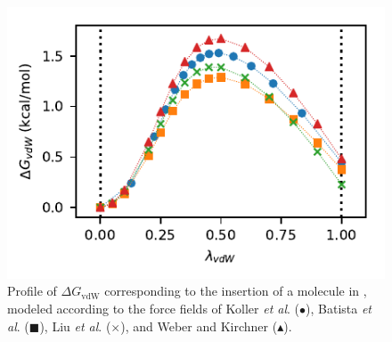 \documentclass[3p,twocolumn]{elsarticle}
\begin{document}
\begin{figure}
\includegraphics[width=\linewidth]{free_energy_paper}
\caption{Profile of $\Delta G_\text{vdW}$ corresponding to the insertion of a  molecule in \ce{[emim][B(CN)_4]}, modeled according to the force fields of Koller \textit{et al}. \cite{Koller_2012} ($\bullet$), Batista \textit{et al}. \cite{Batista_2015} ($\blacksquare$), Liu \textit{et al}. \cite{Liu_2014} ($\times$), and Weber and Kirchner \cite{Weber_2016} ($\blacktriangle$).}
\label{fig:deltag}
\end{figure}
\end{document}

